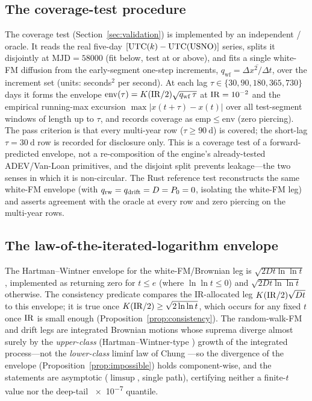 \subsection{The coverage-test procedure}
\label{app:coverage}

The \Validated{} coverage test (Section~\ref{sec:validation}) is implemented by an
independent / oracle. It reads the real five-day
$[\mathrm{UTC}(k){}-\mathrm{UTC(USNO)}]$ series, splits it disjointly at $\mathrm{MJD}=58000$
(fit below, test at or above), and fits a single white-FM diffusion from the
early-segment one-step increments, $q_{\mathrm{wf}}=\overline{\Delta x^{2}/\Delta
t}$, over the increment set (units: seconds$^2$ per second). At each lag
$\tau\in\{30,90,180,365,730\}\,$days it forms the envelope
$\mathrm{env}(\tau)=K(\mathrm{IR}/2)\sqrt{q_{\mathrm{wf}}\,\tau}$ at $\mathrm{IR}=\num{e-2}$ and
the empirical running-max excursion $\max|x(t+\tau)-x(t)|$ over all test-segment
windows of length up to $\tau$, and records coverage as $\mathrm{emp}\le
\mathrm{env}$ (zero piercing). The pass criterion is that every multi-year row
($\tau\ge\SI{90}{\day}$) is covered; the short-lag $\tau=\SI{30}{\day}$ row is
recorded for disclosure only. This is a coverage test of a forward-predicted
envelope, not a re-composition of the engine's already-tested ADEV/Van-Loan
primitives, and the disjoint split prevents leakage---the two senses in which it is
non-circular. The Rust reference test reconstructs the same white-FM envelope
(with $q_{\mathrm{rw}}=q_{\mathrm{drift}}=D=P_0=0$, isolating the white-FM leg)
and asserts agreement with the oracle at every row and zero piercing on the
multi-year rows.

\subsection{The law-of-the-iterated-logarithm envelope}
\label{app:lil}

The Hartman--Wintner envelope for the white-FM/Brownian leg is
$\sqrt{2Dt\ln\ln t}$ \citep{hartman1941}, implemented as 
returning zero for $t\le e$ (where $\ln\ln t\le0$) and $\sqrt{2Dt\ln\ln t}$
otherwise. The consistency predicate  compares the
IR-allocated leg $K(\mathrm{IR}/2)\sqrt{Dt}$ to this envelope; it is true once
$K(\mathrm{IR}/2)\ge\sqrt{2\ln\ln t}$, which occurs for any fixed $t$ once $\mathrm{IR}$ is small
enough (Proposition~\ref{prop:consistency}). The random-walk-FM and drift legs are
integrated Brownian motions whose suprema diverge almost surely by the
\emph{upper-class} (Hartman--Wintner-type \citep{hartman1941}) growth of the
integrated process---not the \emph{lower-class} liminf law of Chung
\citep{chung1948}---so the divergence of the envelope
(Proposition~\ref{prop:impossible}) holds component-wise, and the statements are
asymptotic ($\limsup$, single path), certifying neither a finite-$t$ value nor the
deep-tail \num{e-7} quantile.
